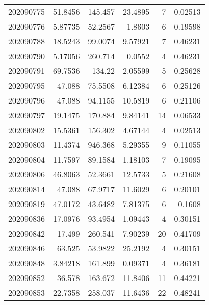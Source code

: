 \begin{tabular}{rrrrrr}
 202090775 &         51.8456  &      145.457  &           23.4895  &           7 & 0.02513 \\
 202090776 &          5.87735 &       52.2567 &            1.8603  &           6 & 0.19598 \\
 202090788 &         18.5243  &       99.0074 &            9.57921 &           7 & 0.46231 \\
 202090790 &          5.17056 &      260.714  &            0.0552  &           4 & 0.46231 \\
 202090791 &         69.7536  &      134.22   &            2.05599 &           5 & 0.25628 \\
 202090795 &         47.088   &       75.5508 &            6.12384 &           6 & 0.25126 \\
 202090796 &         47.088   &       94.1155 &           10.5819  &           6 & 0.21106 \\
 202090797 &         19.1475  &      170.884  &            9.84141 &          14 & 0.06533 \\
 202090802 &         15.5361  &      156.302  &            4.67144 &           4 & 0.02513 \\
 202090803 &         11.4374  &      946.368  &            5.29355 &           9 & 0.11055 \\
 202090804 &         11.7597  &       89.1584 &            1.18103 &           7 & 0.19095 \\
 202090806 &         46.8063  &       52.3661 &           12.5733  &           5 & 0.21608 \\
 202090814 &         47.088   &       67.9717 &           11.6029  &           6 & 0.20101 \\
 202090819 &         47.0172  &       43.6482 &            7.81375 &           6 & 0.1608  \\
 202090836 &         17.0976  &       93.4954 &            1.09443 &           4 & 0.30151 \\
 202090842 &         17.499   &      260.541  &            7.90239 &          20 & 0.41709 \\
 202090846 &         63.525   &       53.9822 &           25.2192  &           4 & 0.30151 \\
 202090848 &          3.84218 &      161.899  &            0.09371 &           4 & 0.36181 \\
 202090852 &         36.578   &      163.672  &           11.8406  &          11 & 0.44221 \\
 202090853 &         22.7358  &      258.037  &           11.6436  &          22 & 0.48241 \\

\end{tabular}
